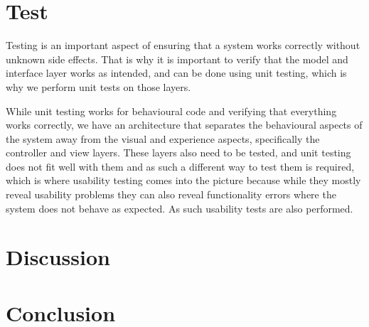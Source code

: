 	\chapter{Test}
	Testing is an important aspect of ensuring that a system works correctly without unknown side effects.
	That is why it is important to verify that the model and interface layer works as intended, and can be done using unit testing, which is why we perform unit tests on those layers.
	
	While unit testing works for behavioural code and verifying that everything works correctly, we have an architecture that separates the behavioural aspects of the system away from the visual and experience aspects, specifically the controller and view layers.
	These layers also need to be tested, and unit testing does not fit well with them and as such a different way to test them is required, which is where usability testing comes into the picture because while they mostly reveal usability problems they can also reveal functionality errors where the system does not behave as expected. 
	As such usability tests are also performed.
	
	
	
	\chapter{Discussion}
	
	
	
	\chapter{Conclusion}
	
	\afterpage{\thispagestyle{empty}}

	
	
	\label{lastpagewithoutappendix}

	\appendix
	
	
	
	\cleardoublepage

